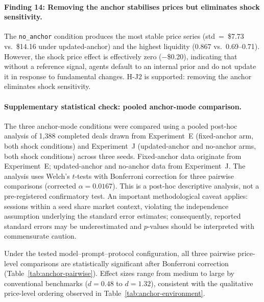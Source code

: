 \paragraph{Finding 14: Removing the anchor stabilises prices but eliminates shock sensitivity.}
The \texttt{no\_anchor} condition produces the most stable price series (std~=~\$7.73 vs.\ \$14.16 under updated-anchor) and the highest liquidity (0.867 vs.\ 0.69--0.71).  However, the shock price effect is effectively zero ($-$\$0.20), indicating that without a reference signal, agents default to an internal prior and do not update it in response to fundamental changes.  H-J2 is supported: removing the anchor eliminates shock sensitivity.

\paragraph{Supplementary statistical check: pooled anchor-mode comparison.}
The three anchor-mode conditions were compared using a pooled post-hoc analysis of 1{,}388 completed deals drawn from Experiment~E (fixed-anchor arm, both shock conditions) and Experiment~J (updated-anchor and no-anchor arms, both shock conditions) across three seeds.  Fixed-anchor data originate from Experiment~E; updated-anchor and no-anchor data from Experiment~J.  The analysis uses Welch's $t$-tests with Bonferroni correction for three pairwise comparisons (corrected $\alpha = 0.0167$).  This is a post-hoc descriptive analysis, not a pre-registered confirmatory test.  An important methodological caveat applies: sessions within a seed share market context, violating the independence assumption underlying the standard error estimates; consequently, reported standard errors may be underestimated and $p$-values should be interpreted with commensurate caution.

Under the tested model--prompt--protocol configuration, all three pairwise price-level comparisons are statistically significant after Bonferroni correction (Table~\ref{tab:anchor-pairwise}).  Effect sizes range from medium to large by conventional benchmarks ($d = 0.48$ to $d = 1.32$), consistent with the qualitative price-level ordering observed in Table~\ref{tab:anchor-environment}.

